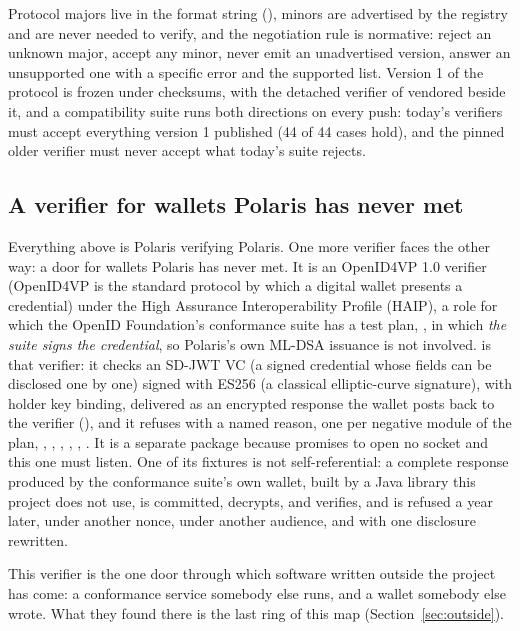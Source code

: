 Protocol majors live in the format string (), minors are advertised by the
registry and are never needed to verify, and the negotiation rule is normative: reject an unknown
major, accept any minor, never emit an unadvertised version, answer an unsupported one with a
specific error and the supported list. Version 1 of the protocol is frozen under checksums, with the
detached verifier of  vendored beside it, and a compatibility suite runs both directions
on every push: today's verifiers must accept everything version 1 published (44 of 44 cases hold),
and the pinned older verifier must never accept what today's suite rejects. \sImpl

\subsection{A verifier for wallets Polaris has never met}

Everything above is Polaris verifying Polaris. One more verifier faces the other way: a door for
wallets Polaris has never met. It is an OpenID4VP 1.0 verifier (OpenID4VP is the standard protocol by which a digital wallet presents
a credential) under the High Assurance Interoperability Profile (HAIP), a role for which the OpenID Foundation's conformance suite has a test plan, , in which \emph{the suite signs the
credential}, so Polaris's own ML-DSA issuance is not involved.  is that
verifier: it checks an SD-JWT VC (a signed credential whose fields can be disclosed one by one) signed with
ES256 (a classical elliptic-curve signature), with holder key binding, delivered as an
encrypted response the wallet posts back to the verifier (), and it refuses with a named reason, one per negative
module of the plan, , , , ,
, . It is a separate package because 
promises to open no socket and this one must listen. One of its fixtures is not self-referential: a
complete response produced by the conformance suite's own wallet, built by a Java library this
project does not use, is committed, decrypts, and verifies, and is refused a year later, under another
nonce, under another audience, and with one disclosure rewritten. \sImpl

This verifier is the one door through which software written outside the project has come: a
conformance service somebody else runs, and a wallet somebody else wrote. What they found there is the
last ring of this map (Section~\ref{sec:outside}).

